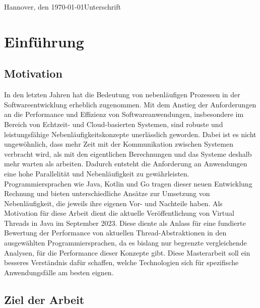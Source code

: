 \documentclass[fontsize=12pt,paper=a4,twoside=semi,parskip=half-,headsepline,headinclude]{scrreprt}
\begin{document}
Hannover, den \today \hfill Unterschrift


\newpage 
\thispagestyle{empty}
\quad 
\newpage


  \tableofcontents  %

\listoffigures      %

\listoftables       %

\chapter{Einführung}

\section{Motivation}

In den letzten Jahren hat die Bedeutung von nebenläufigen Prozessen in der Softwareentwicklung erheblich zugenommen. Mit dem Anstieg der Anforderungen an die Performance und Effizienz von Softwareanwendungen, insbesondere im Bereich von Echtzeit- und Cloud-basierten Systemen, sind robuste und leistungsfähige Nebenläufigkeitskonzepte unerlässlich geworden. Dabei ist es nicht ungewöhnlich, dass mehr Zeit mit der Kommunikation zwischen Systemen verbracht wird, als mit den eigentlichen Berechnungen und das Systeme deshalb mehr warten als arbeiten. Dadurch entsteht die Anforderung an Anwendungen eine hohe Parallelität und Nebenläufigkeit zu gewährleisten. Programmiersprachen wie Java, Kotlin und Go tragen dieser neuen Entwicklung Rechnung und bieten unterschiedliche Ansätze zur Umsetzung von Nebenläufigkeit, die jeweils ihre eigenen Vor- und Nachteile haben. Als Motivation für diese Arbeit dient die aktuelle Veröffentlichung von Virtual Threads in Java im September 2023. Diese diente als Anlass für eine fundierte Bewertung der Performance von aktuellen Thread-Abstraktionen in den ausgewählten Programmiersprachen, da es bislang nur begrenzte vergleichende Analysen, für die Performance dieser Konzepte gibt. Diese Masterarbeit soll ein besseres Verständnis dafür schaffen, welche Technologien sich für spezifische Anwendungsfälle am besten eignen.

\section{Ziel der Arbeit}
\end{document}

